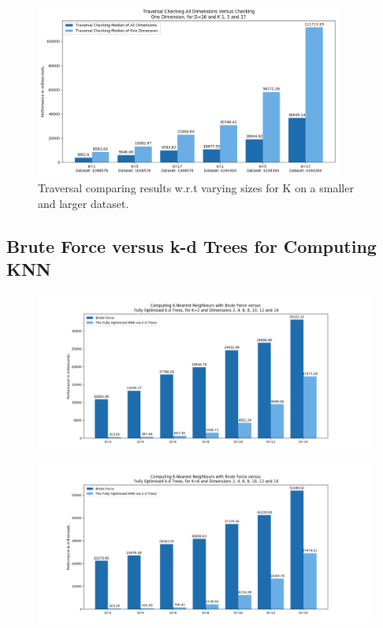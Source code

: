 \begin{figure}[H]
\centering
\includegraphics[width=0.9\textwidth]{pics/plot-figs/trav-d16.png}
\caption{Traversal comparing results w.r.t varying sizes for K on a smaller and larger dataset.}
\end{figure}





\subsection{Brute Force versus k-d Trees for Computing KNN}






\begin{figure}[H]
\centering
\includegraphics[width=1\textwidth]{pics/plot-figs/brute-mult-k2.png}
\caption{}
\end{figure}


\begin{figure}[H]
\centering
\includegraphics[width=1\textwidth]{pics/plot-figs/brute-mult-k6.png}
\caption{}
\end{figure}


